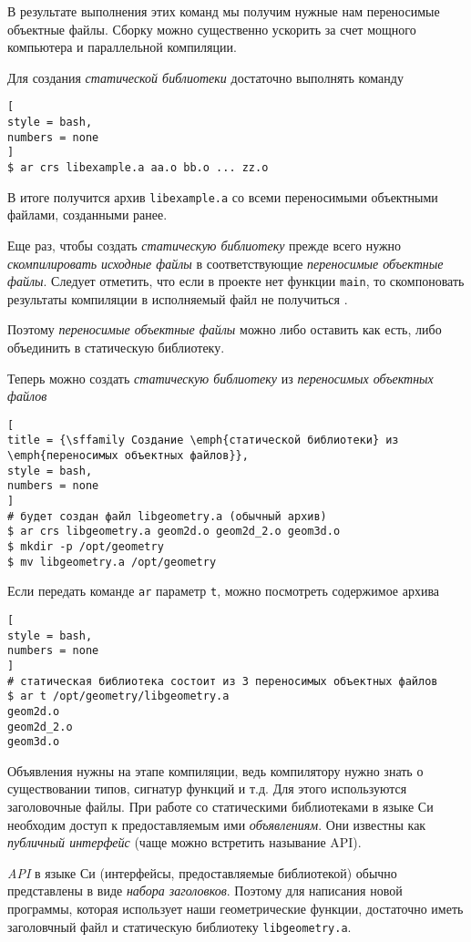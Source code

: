 \documentclass[%
	11pt,
	a4paper,
	utf8,
		]{article}
\begin{document}
В результате выполнения этих команд мы получим нужные нам переносимые объектные файлы. Сборку можно существенно ускорить за счет мощного компьютера и параллельной компиляции.

Для создания \emph{статической библиотеки} достаточно выполнять команду
\begin{lstlisting}[
style = bash,
numbers = none
]
$ ar crs libexample.a aa.o bb.o ... zz.o
\end{lstlisting}

В итоге получится архив \verb|libexample.a| со всеми переносимыми объектными файлами, созданными ранее.

Еще раз, чтобы создать \emph{статическую библиотеку} прежде всего нужно \emph{скомпилировать} \emph{исходные файлы} в соответствующие \emph{переносимые объектные файлы}. Следует отметить, что если в проекте нет функции \verb|main|, то скомпоновать результаты компиляции в исполняемый файл не получиться \cite[]{amini-extreme-c:2022}.

Поэтому \emph{переносимые объектные файлы} можно либо оставить как есть, либо объединить в статическую библиотеку.

Теперь можно создать \emph{статическую библиотеку} из \emph{переносимых объектных файлов}
\begin{lstlisting}[
title = {\sffamily Создание \emph{статической библиотеки} из \emph{переносимых объектных файлов}},
style = bash,
numbers = none
]
# будет создан файл libgeometry.a (обычный архив)
$ ar crs libgeometry.a geom2d.o geom2d_2.o geom3d.o  
$ mkdir -p /opt/geometry
$ mv libgeometry.a /opt/geometry
\end{lstlisting}

Если передать команде \verb|ar| параметр \verb|t|, можно посмотреть содержимое архива
\begin{lstlisting}[
style = bash,
numbers = none
]
# статическая библиотека состоит из 3 переносимых объектных файлов
$ ar t /opt/geometry/libgeometry.a
geom2d.o
geom2d_2.o
geom3d.o
\end{lstlisting}

Объявления нужны на этапе компиляции, ведь компилятору нужно знать о существовании типов, сигнатур функций и т.д. Для этого используются заголовочные файлы. При работе со статическими библиотеками в языке Си необходим доступ к предоставляемым ими \emph{объявлениям}. Они известны как \emph{публичный интерфейс} (чаще можно встретить называние API).

\emph{API} в языке Си (интерфейсы, предоставляемые библиотекой) обычно представлены в виде \emph{набора заголовков}. Поэтому для написания новой программы, которая использует наши геометрические функции, достаточно иметь заголовчный файл и статическую библиотеку \verb|libgeometry.a|.
\end{document}
